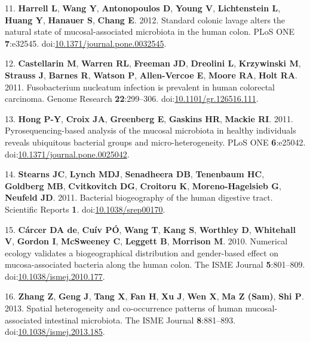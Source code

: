\documentclass[11pt,]{article}
\begin{document}
\hypertarget{ref-Harrell2012}{}
11. \textbf{Harrell L}, \textbf{Wang Y}, \textbf{Antonopoulos D},
\textbf{Young V}, \textbf{Lichtenstein L}, \textbf{Huang Y},
\textbf{Hanauer S}, \textbf{Chang E}. 2012. Standard colonic lavage
alters the natural state of mucosal-associated microbiota in the human
colon. PLoS ONE \textbf{7}:e32545.
doi:\href{https://doi.org/10.1371/journal.pone.0032545}{10.1371/journal.pone.0032545}.

\hypertarget{ref-Castellarin2011}{}
12. \textbf{Castellarin M}, \textbf{Warren RL}, \textbf{Freeman JD},
\textbf{Dreolini L}, \textbf{Krzywinski M}, \textbf{Strauss J},
\textbf{Barnes R}, \textbf{Watson P}, \textbf{Allen-Vercoe E},
\textbf{Moore RA}, \textbf{Holt RA}. 2011. Fusobacterium nucleatum
infection is prevalent in human colorectal carcinoma. Genome Research
\textbf{22}:299--306.
doi:\href{https://doi.org/10.1101/gr.126516.111}{10.1101/gr.126516.111}.

\hypertarget{ref-Hong2011}{}
13. \textbf{Hong P-Y}, \textbf{Croix JA}, \textbf{Greenberg E},
\textbf{Gaskins HR}, \textbf{Mackie RI}. 2011. Pyrosequencing-based
analysis of the mucosal microbiota in healthy individuals reveals
ubiquitous bacterial groups and micro-heterogeneity. PLoS ONE
\textbf{6}:e25042.
doi:\href{https://doi.org/10.1371/journal.pone.0025042}{10.1371/journal.pone.0025042}.

\hypertarget{ref-Stearns2011}{}
14. \textbf{Stearns JC}, \textbf{Lynch MDJ}, \textbf{Senadheera DB},
\textbf{Tenenbaum HC}, \textbf{Goldberg MB}, \textbf{Cvitkovitch DG},
\textbf{Croitoru K}, \textbf{Moreno-Hagelsieb G}, \textbf{Neufeld JD}.
2011. Bacterial biogeography of the human digestive tract. Scientific
Reports \textbf{1}.
doi:\href{https://doi.org/10.1038/srep00170}{10.1038/srep00170}.

\hypertarget{ref-deCarcer2010}{}
15. \textbf{Cárcer DA de}, \textbf{Cuív PÓ}, \textbf{Wang T},
\textbf{Kang S}, \textbf{Worthley D}, \textbf{Whitehall V},
\textbf{Gordon I}, \textbf{McSweeney C}, \textbf{Leggett B},
\textbf{Morrison M}. 2010. Numerical ecology validates a biogeographical
distribution and gender-based effect on mucosa-associated bacteria along
the human colon. The ISME Journal \textbf{5}:801--809.
doi:\href{https://doi.org/10.1038/ismej.2010.177}{10.1038/ismej.2010.177}.

\hypertarget{ref-Zhang2013}{}
16. \textbf{Zhang Z}, \textbf{Geng J}, \textbf{Tang X}, \textbf{Fan H},
\textbf{Xu J}, \textbf{Wen X}, \textbf{Ma Z (Sam)}, \textbf{Shi P}.
2013. Spatial heterogeneity and co-occurrence patterns of human
mucosal-associated intestinal microbiota. The ISME Journal
\textbf{8}:881--893.
doi:\href{https://doi.org/10.1038/ismej.2013.185}{10.1038/ismej.2013.185}.
\end{document}
